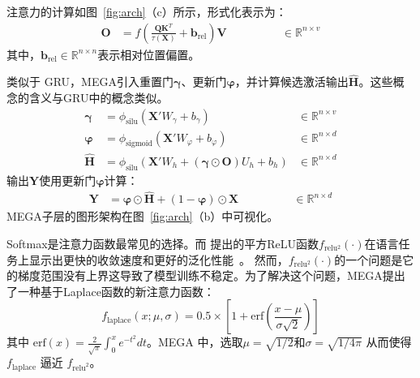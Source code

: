 注意力的计算如图~\ref{fig:arch}（c）所示，形式化表示为：
\begin{align}\label{eq:attention2}
\boldsymbol{O} & = f \left(\frac{\boldsymbol{Q}{\boldsymbol{K}}^{T}}{\tau(\boldsymbol{X})} + \boldsymbol{b}_{\mathrm{rel}} \right) \boldsymbol{V} \quad & \quad \qquad \in \mathbb{R}^{n\times v}
\end{align}
其中，$\boldsymbol{b}_{\mathrm{rel}} \in \mathbb{R}^{n\times n}$表示相对位置偏置。

类似于 GRU，MEGA引入重置门$\boldsymbol{\gamma}$、更新门$\boldsymbol{\varphi}$，并计算候选激活输出$\boldsymbol{\hat{H}}$。这些概念的含义与GRU中的概念类似。
\begin{align}
\boldsymbol{\gamma} & = \phi_{\mathrm{silu}}(\boldsymbol{X}' W_\gamma + b_\gamma) & \in \mathbb{R}^{n\times v} \label{eq:reset} \\
\boldsymbol{\varphi} & = \phi_{\mathrm{sigmoid}}(\boldsymbol{X}' W_\varphi + b_\varphi) & \in \mathbb{R}^{n\times d} \label{eq:update} \\
\boldsymbol{\hat{H}} & = \phi_{\mathrm{silu}}(\boldsymbol{X}' W_h + (\boldsymbol{\gamma} \odot \boldsymbol{O}) U_{h} + b_h) & \in \mathbb{R}^{n\times d} \label{eq:candidate}
\end{align}
输出$\boldsymbol{Y}$使用更新门$\boldsymbol{\varphi}$计算：
\begin{align}
\boldsymbol{Y} & = \boldsymbol{\varphi} \odot \boldsymbol{\hat{H}} + (1 - \boldsymbol{\varphi}) \odot \boldsymbol{X} \qquad & \qquad \in \mathbb{R}^{n\times d} \label{eq:output}
\end{align}
MEGA子层的图形架构在图~\ref{fig:arch}（b）中可视化。

Softmax是注意力函数最常见的选择。而
\cite{so2021searching}提出的平方ReLU函数$f_{\mathrm{relu^2}}(\cdot)$在语言任务上显示出更快的收敛速度和更好的泛化性能~\cite{hua2022transformer}。
然而，$f_{\mathrm{relu^2}}(\cdot)$的一个问题是它的梯度范围没有上界这导致了模型训练不稳定。为了解决这个问题，MEGA提出了一种基于Laplace函数的新注意力函数：
\begin{equation}
\label{eq:laplace}
f_{\mathrm{laplace}}(x; \mu,\sigma) = 0.5 \times \left[1 + \mathrm{erf}(\frac{x - \mu}{\sigma\sqrt{2}}) \right]
\end{equation}
其中 $\mathrm{erf}(x) = \frac{2}{\sqrt{\pi}} \int_0^x e^{-t^2} dt$。MEGA 中，选取$\mu=\sqrt{1/2}$和$\sigma=\sqrt{1/4\pi}$ 从而使得 $f_{\mathrm{laplace}}$ 逼近 $f_{\mathrm{relu}^2}$。


\label{subsec:mega-chunk}

